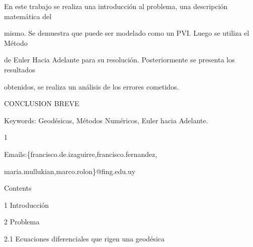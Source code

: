 \documentclass[a4paper,portrait,12pt]{article}
\begin{document}
\begin{flushleft}
En este trabajo se realiza una introducción al problema, una descripción matemática del
\end{flushleft}


\begin{flushleft}
mismo. Se demuestra que puede ser modelado como un PVI. Luego se utiliza el Método
\end{flushleft}


\begin{flushleft}
de Euler Hacia Adelante para su resolución. Posteriormente se presenta los resultados
\end{flushleft}


\begin{flushleft}
obtenidos, se realiza un análisis de los errores cometidos.
\end{flushleft}


\begin{flushleft}
CONCLUSION BREVE
\end{flushleft}


\begin{flushleft}
Keywords: Geodésicas, Métodos Numéricos, Euler hacia Adelante.
\end{flushleft}





1





\begin{flushleft}
Emails:\{francisco.de.izaguirre,francisco.fernandez,
\end{flushleft}


\begin{flushleft}
maria.mullukian,marco.rolon\}@fing.edu.uy
\end{flushleft}





\begin{flushleft}
\newpage
Contents
\end{flushleft}


\begin{flushleft}
1 Introducción
\end{flushleft}


\begin{flushleft}
2 Problema
\end{flushleft}


\begin{flushleft}
2.1 Ecuaciones diferenciales que rigen una geodésica
\end{flushleft}
\end{document}
